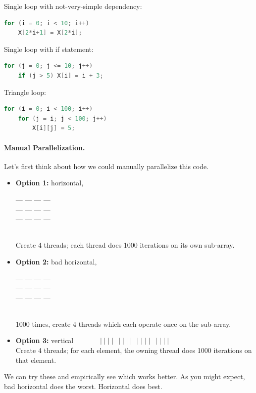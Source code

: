 \documentclass[a4paper]{report}
\begin{document}
  Single loop with not-very-simple dependency:
  \begin{lstlisting}[language=C]
for (i = 0; i < 10; i++)
    X[2*i+1] = X[2*i];
  \end{lstlisting}

  Single loop with if statement:
  \begin{lstlisting}[language=C]
for (j = 0; j <= 10; j++)
    if (j > 5) X[i] = i + 3;
  \end{lstlisting}

  Triangle loop:
  \begin{lstlisting}[language=C]
for (i = 0; i < 100; i++)
    for (j = i; j < 100; j++)
        X[i][j] = 5;
  \end{lstlisting}

\paragraph{Manual Parallelization.} Let's first think about how we could 
manually parallelize this code.
\begin{itemize}
\item {\bf Option 1:} horizontal, \begin{minipage}{7em} --- --- --- ---\\[-.8em] --- --- --- ---\\[-.8em] --- --- --- --- \end{minipage} \\
Create 4 threads; each thread does 1000 iterations on its own sub-array.

\item {\bf Option 2:} bad horizontal, \begin{minipage}{7em} --- --- --- ---\\[-.8em] --- --- --- ---\\[-.8em] --- --- --- --- \end{minipage} \\
1000 times, create 4 threads which each operate once on the sub-array.

\item {\bf Option 3:} vertical $ \quad \: \qquad \mid \mid \mid\mid \:\: \mid \mid \mid \mid \:\: \mid \mid \mid \mid\:\: \mid \mid \mid \mid$\\
Create 4 threads; for each element, the owning thread does 1000 iterations on that element.
\end{itemize}
We can try these and empirically see which works better. As you might expect, bad horizontal
does the worst. Horizontal does best.
\end{document}
